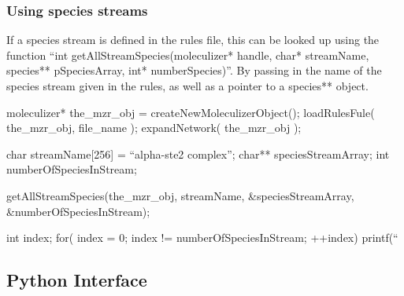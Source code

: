 \subsubsection{Using species streams}
If a species stream is defined in the rules file, this can be looked
up using the function ``int getAllStreamSpecies(moleculizer* handle,
char* streamName, species** pSpeciesArray, int* numberSpecies)''. By
passing in the name of the species stream given in the rules, as well
as a pointer to a species** object.  

\begin{ExampleC}
moleculizer* the_mzr_obj = createNewMoleculizerObject();
loadRulesFule( the_mzr_obj, file_name );
expandNetwork( the_mzr_obj );

char streamName[256] = ``alpha-ste2 complex'';
char** speciesStreamArray;
int numberOfSpeciesInStream;

getAllStreamSpecies(the_mzr_obj, streamName, &speciesStreamArray,
&numberOfSpeciesInStream);

int index;
for( index = 0; index != numberOfSpeciesInStream; ++index)
{
  printf(``%
}

\end{ExampleC}

\subsection{Python Interface}







